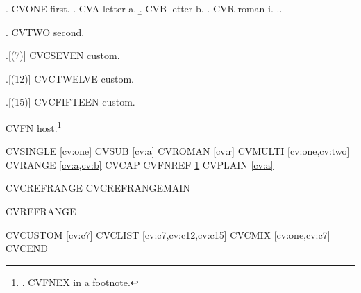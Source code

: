 
\usepackage{cleveref}

\ex.\label{cv:one} CVONE first.
\a.\label{cv:a} CVA letter a.
\b.\label{cv:b} CVB letter b.
\a.\label{cv:r} CVR roman i.
\z.\z.

\ex.\label{cv:two} CVTWO second.

\ex.[(7)]\label{cv:c7} CVCSEVEN custom.

\ex.[(12)]\label{cv:c12} CVCTWELVE custom.

\ex.[(15)]\label{cv:c15} CVCFIFTEEN custom.

CVFN host.\footnote{\ex.\label{cv:fn} CVFNEX in a footnote.

}

CVSINGLE \cref{cv:one} CVSUB \cref{cv:a} CVROMAN \cref{cv:r}
CVMULTI \cref{cv:one,cv:two} CVRANGE \cref{cv:a,cv:b}
CVCAP  CVFNREF \cref{cv:fn} CVPLAIN \ref{cv:a}

CVCREFRANGE  CVCREFRANGEMAIN 

CVREFRANGE 

CVCUSTOM \cref{cv:c7} CVCLIST \cref{cv:c7,cv:c12,cv:c15} CVCMIX
\cref{cv:one,cv:c7} CVCEND

